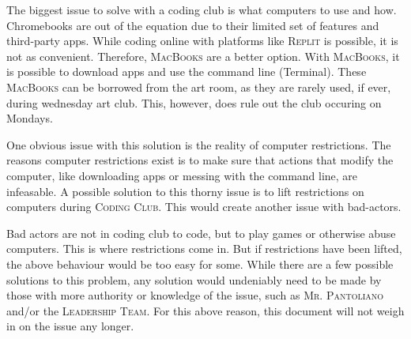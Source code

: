 \documentclass{report}
\begin{document}
            The biggest issue to solve with a coding club is what computers to use and how. Chromebooks are out of the equation due to their limited set of features and third-party apps. While coding online with platforms like \textsc{Replit} is possible, it is not as convenient. Therefore, \textsc{MacBooks} are a better option. With \textsc{MacBooks}, it is possible to download apps and use the command line (Terminal). These \textsc{MacBooks} can be borrowed from the art room, as they are rarely used, if ever, during wednesday art club. This, however, does rule out the club occuring on Mondays.

            One obvious issue with this solution is the reality of computer restrictions. The reasons computer restrictions exist is to make sure that actions that modify the computer, like downloading apps or messing with the command line, are infeasable. A possible solution to this thorny issue is to lift restrictions on computers during \textsc{Coding Club}. This would create another issue with bad-actors.

            Bad actors are not in coding club to code, but to play games or otherwise abuse computers. This is where restrictions come in. But if restrictions have been lifted, the above behaviour would be too easy for some. While there are a few possible solutions to this problem, any solution would undeniably need to be made by those with more authority or knowledge of the issue, such as \textsc{Mr. Pantoliano} and/or the \textsc{Leadership Team}. For this above reason, this document will not weigh in on the issue any longer.
\end{document}
